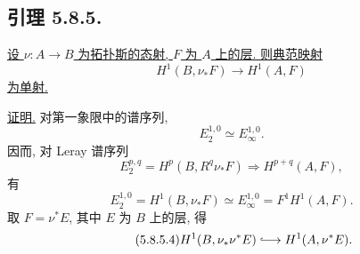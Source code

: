 \subsection*{引理 5.8.5.}
\underline{设 $\nu:A\to B$ 为拓扑斯的态射, $F$ 为 $A$ 上的层. 则典范映射}
\begin{equation}\tag{5.8.5.1}
H^1(B,\nu_*F)\longrightarrow H^1(A,F)
\end{equation}
\underline{为单射.}

\underline{证明.}
对第一象限中的谱序列,
\begin{equation}\tag{5.8.5.2}
E_2^{1,0}\simeq E_\infty^{1,0}.
\end{equation}
因而, 对 Leray 谱序列
\[
E_2^{p,q}=H^p(B,R^q\nu_*F)
\Longrightarrow H^{p+q}(A,F),
\]
有
\begin{equation}\tag{5.8.5.3}
E_2^{1,0}=H^1(B,\nu_*F)
\simeq E_\infty^{1,0}
=F^1H^1(A,F).
\end{equation}
取 $F=\nu^*E$, 其中 $E$ 为 $B$ 上的层, 得
\begin{equation}\tag{5.8.5.4}
H^1(B,\nu_*\nu^*E)
\lhook\joinrel\longrightarrow
H^1(A,\nu^*E).
\end{equation}

